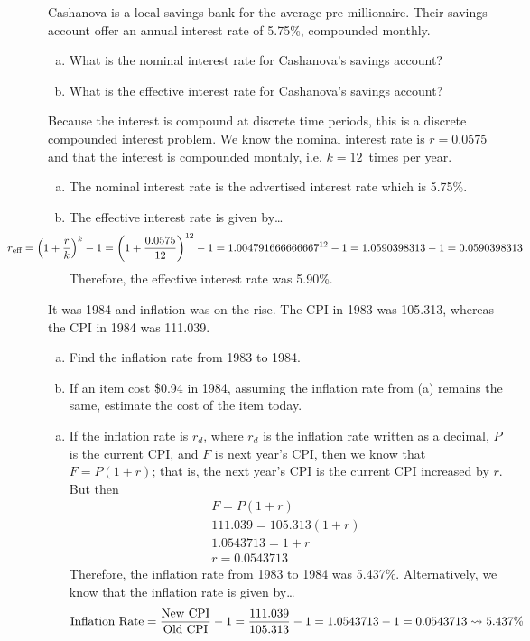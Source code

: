 \documentclass[12pt,letterpaper]{exam}
\begin{document}
\begin{questions}
\newpage
\question[10] Cashanova is a local savings bank for the average pre-millionaire. Their savings account offer an annual interest rate of 5.75\%, compounded monthly. 
	\begin{enumerate}[(a)]
	\item What is the nominal interest rate for Cashanova's savings account?
	\item What is the effective interest rate for Cashanova's savings account?
	\end{enumerate} \pspace

\sol Because the interest is compound at discrete time periods, this is a discrete compounded interest problem. We know the nominal interest rate is $r= 0.0575$ and that the interest is compounded monthly, i.e. $k= 12$~times per year. \pspace

\begin{enumerate}[(a)]
\item The nominal interest rate is the advertised interest rate which is 5.75\%. \pspace
\item The effective interest rate is given by\dots
	\[
	\hspace{-2cm} r_{\text{eff}}= \left(1 + \dfrac{r}{k} \right)^k - 1= \left(1 + \dfrac{0.0575}{12} \right)^{12} - 1= 1.004791666666667^{12} - 1= 1.0590398313 - 1= 0.0590398313
	\]
Therefore, the effective interest rate was 5.90\%. 
\end{enumerate}



\newpage
\question[10] It was 1984 and inflation was on the rise. The CPI in 1983 was 105.313, whereas the CPI in 1984 was 111.039. 
	\begin{enumerate}[(a)]
	\item Find the inflation rate from 1983 to 1984.
	\item If an item cost \$0.94 in 1984, assuming the inflation rate from (a) remains the same, estimate the cost of the item today. 
	\end{enumerate} \pspace

\sol 
\begin{enumerate}[(a)]
\item If the inflation rate is $r_d$, where $r_d$ is the inflation rate written as a decimal, $P$ is the current CPI, and $F$ is next year's CPI, then we know that $F= P(1 + r)$; that is, the next year's CPI is the current CPI increased by $r$. But then 
	\[
	\begin{gathered}
	F= P(1 + r) \\
	111.039= 105.313(1 + r) \\
	1.0543713= 1 + r \\
	r= 0.0543713
	\end{gathered}
	\]
Therefore, the inflation rate from 1983 to 1984 was 5.437\%. Alternatively, we know that the inflation rate is given by\dots
	\[
	\text{Inflation Rate}= \dfrac{\text{New CPI}}{\text{Old CPI}} - 1= \dfrac{111.039}{105.313} - 1= 1.0543713 - 1= 0.0543713 \rightsquigarrow 5.437\%
	\] \pspace


\end{enumerate}
\end{questions}
\end{document}
